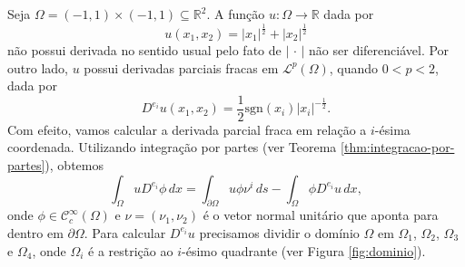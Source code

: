 \documentclass[a4paper, 11pt]{book}
\theoremstyle{definition}
\newcommand{\bR}{\mathbb{R}}
\newcommand{\cC}{\mathcal{C}}
\newcommand{\cL}{\mathcal{L}}
\newcommand{\sgn}{\mathrm{sgn}}
\begin{document}
\begin{ex}
    Seja $\Omega = (-1,1) \times (-1,1) \subseteq \bR^2$. A função $u : \Omega \to \bR$ dada por
    \[
        u(x_1,x_2) = |x_1|^{\frac{1}{2}} + |x_2|^{\frac{1}{2}}
    \]
    não possui derivada no sentido usual pelo fato de $|\,\cdot\,|$ não ser diferenciável.
    Por outro lado, $u$ possui derivadas parciais fracas em $\cL^p(\Omega)$, quando $0 < p < 2$, dada por
    \[
        D^{e_i}u(x_1,x_2) = \frac{1}{2}\sgn(x_i) |x_i|^{-\frac{1}{2}}.
    \]
    Com efeito, vamos calcular a derivada parcial fraca em relação a $i$-ésima coordenada. Utilizando integração por partes (ver Teorema \ref{thm:integracao-por-partes}), obtemos
    \begin{equation} \label{eq:derivada-fraca-exemplo-legal}
        \int_\Omega u D^{e_i} \phi \,dx = \int_{\partial\Omega} u \phi \nu^i \,ds - \int_\Omega \phi D^{e_i}u \,dx,
    \end{equation}
    onde $\phi \in \cC^\infty_c(\Omega)$ e $\nu = (\nu_1, \nu_2)$ é o vetor normal unitário que aponta para dentro em $\partial \Omega$.
    Para calcular $D^{e_i} u$ precisamos dividir o domínio $\Omega$ em $\Omega_1$, $\Omega_2$, $\Omega_3$ e $\Omega_4$, onde $\Omega_i$ é a restrição ao $i$-ésimo quadrante (ver Figura \ref{fig:dominio}).
    \begin{figure}[H]
        \centering
\end{figure}
\end{ex}
\end{document}
